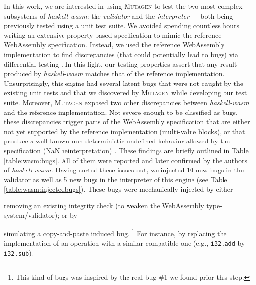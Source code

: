 \documentclass[sigconf, anonymous, review]{acmart}
\newcommand{\mutagen}{\textsc{Mutagen}\xspace}
\begin{document}
In this work, we are interested in using \mutagen to test the two most complex
subsystems of \textit{haskell-wasm}: the \emph{validator} and the
\emph{interpreter} --- both being previously tested using a unit test suite.
%
We avoided spending countless hours writing an extensive property-based
specification to mimic the reference WebAssembly specification.
%
Instead, we used the reference WebAssembly implementation to find discrepancies
(that could potentially lead to bugs) via differential testing
\cite{mckeeman1998differential}.
%
In this light, our testing properties assert that any result produced by
\textit{haskell-wasm} matches that of the reference implementation.
%
Unsurprisingly, this engine had several latent bugs that were not caught by the
existing unit tests and that we discovered by \mutagen while developing our test
suite.
%
Moreover, \mutagen exposed two other discrepancies between \textit{haskell-wasm}
and the reference implementation.
%
Not severe enough to be classified as bugs, these discrepancies trigger parts of
the WebAssembly specification that are either not yet supported by the reference
implementation (multi-value blocks), or that produce a well-known
non-deterministic undefined behavior allowed by the specification (NaN
reinterpretation) \cite{perenyi2020stack}.
%
These findings are briefly outlined in Table \ref{table:wasm:bugs}.
%
All of them were reported and later confirmed by the authors of
\textit{haskell-wasm}.
%
Having sorted these issues out, we injected 10 new bugs in the validator as well
as 5 new bugs in the interpreter of this engine (see Table
\ref{table:wasm:injectedbugs}).
%
These bugs were mechanically injected by either
%
\begin{inparaenum}
\item removing an existing integrity check (to weaken the WebAssembly
  type-system/validator); or by
\item simulating a copy-and-paste induced bug.%
  \footnote{This kind of bugs was inspired by the real bug \#1 we found prior
    this step.}
  For instance, by replacing the implementation of an operation with a similar
  compatible one (e.g., \texttt{i32.add} by \texttt{i32.sub}).
\end{inparaenum}


\end{document}
